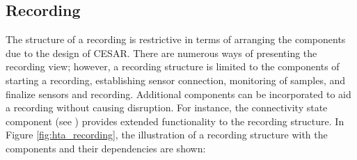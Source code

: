 
\subsection{Recording}\label{soc:recording}
The structure of a recording is restrictive in terms of arranging the components due to the design of CESAR. There are numerous ways of presenting the recording view; however, a recording structure is limited to the components of starting a recording, establishing sensor connection, monitoring of samples, and finalize sensors and recording. Additional components can be incorporated to aid a recording without causing disruption. For instance, the connectivity state component (see ) provides extended functionality to the recording structure. In Figure \ref{fig:hta_recording}, the illustration of a recording structure with the components and their dependencies are shown:

